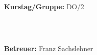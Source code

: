 \documentclass[12pt,a4paper]{article}
\begin{document}
\begin{verbatim}


\end{verbatim}
			\begin{flushleft}
			\textbf{\Large{Kurstag/Gruppe:}} \Large{DO/2}
			\end{flushleft}

\begin{verbatim}



\end{verbatim}
			\begin{flushleft}
			\LARGE{\textbf{Betreuer:}}	\Large{Franz Sachslehner}	
			\end{flushleft}
\end{document}
